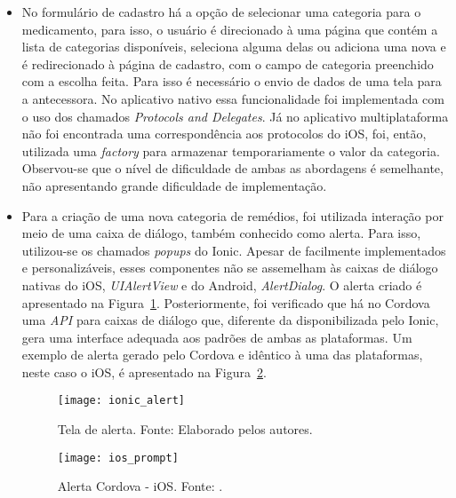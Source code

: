 \begin{itemize}
\begin{itemize}
		 	\item No formulário de cadastro há a opção de selecionar uma categoria para o medicamento, para isso, o usuário é direcionado à uma página que contém a lista de categorias disponíveis, seleciona alguma delas ou adiciona uma nova e é redirecionado à página de cadastro, com o campo de categoria preenchido com a escolha feita. Para isso é necessário o envio de dados de uma tela para a antecessora. No aplicativo nativo essa funcionalidade foi implementada com o uso dos chamados \textit{Protocols and Delegates}. Já no aplicativo multiplataforma não foi encontrada uma correspondência aos protocolos do iOS, foi, então, utilizada uma \textit{factory} para armazenar temporariamente o valor da categoria. Observou-se que o nível de dificuldade de ambas as abordagens é semelhante, não apresentando grande dificuldade de implementação.
			 
			\item Para a criação de uma nova categoria de remédios, foi utilizada interação por meio de uma caixa de diálogo, também conhecido como alerta. Para isso, utilizou-se os chamados \textit{popups} do Ionic.  Apesar de facilmente implementados e personalizáveis, esses componentes não se assemelham às caixas de diálogo nativas do iOS, \textit{UIAlertView} e do Android, \textit{AlertDialog}. O alerta criado é apresentado na Figura~\ref{fig:ionic_alert}. Posteriormente,  foi verificado que há no Cordova uma \textit{API} para caixas de diálogo que, diferente da disponibilizada pelo Ionic, gera uma interface adequada aos padrões de ambas as plataformas. Um exemplo de alerta  gerado pelo Cordova e idêntico à uma das plataformas, neste caso o iOS, é apresentado na Figura~\ref{fig:ios_prompt}.
			 	
			 	\begin{figure}[H]
			 		\centering
			 		\texttt{[image: ionic\_alert]}
			 		\caption[Tela de alerta]{Tela de alerta. Fonte: Elaborado pelos autores.}
			 		\label{fig:ionic_alert}
			 	\end{figure}
			 	
			 	\begin{figure}[H]
			 		\centering
			 		\texttt{[image: ios\_prompt]}
			 		\caption[Alerta Cordova - iOS]{Alerta Cordova - iOS. Fonte: \cite{framework_ngcordova_2016}.}
			 		\label{fig:ios_prompt}
			 	\end{figure}
			 	
			 	

\end{itemize}
\end{itemize}
